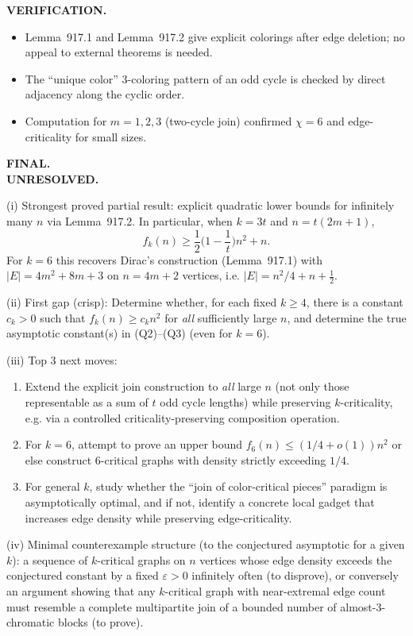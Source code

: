 \medskip
\noindent\textbf{VERIFICATION.}\\
\begin{itemize}
\item Lemma~917.1 and Lemma~917.2 give explicit colorings after edge deletion; no appeal to external theorems is needed.
\item The ``unique color'' 3-coloring pattern of an odd cycle is checked by direct adjacency along the cyclic order.
\item Computation for $m=1,2,3$ (two-cycle join) confirmed $\chi=6$ and edge-criticality for small sizes.
\end{itemize}

\medskip
\noindent\textbf{FINAL.}\\
\textbf{UNRESOLVED.}

(i) Strongest proved partial result: explicit quadratic lower bounds for infinitely many $n$ via Lemma~917.2. In particular, when $k=3t$ and $n=t(2m+1)$,
\[
 f_k(n)\ge \frac12\Big(1-\frac{1}{t}\Big)n^2+n.
\]
For $k=6$ this recovers Dirac's construction (Lemma~917.1) with $|E|=4m^2+8m+3$ on $n=4m+2$ vertices, i.e. $|E|=n^2/4+n+\tfrac12$.

(ii) First gap (crisp): Determine whether, for each fixed $k\ge 4$, there is a constant $c_k>0$ such that $f_k(n)\ge c_k n^2$ for \emph{all} sufficiently large $n$, and determine the true asymptotic constant(s) in (Q2)--(Q3) (even for $k=6$).

(iii) Top 3 next moves:
\begin{enumerate}
\item Extend the explicit join construction to \emph{all} large $n$ (not only those representable as a sum of $t$ odd cycle lengths) while preserving $k$-criticality, e.g. via a controlled criticality-preserving composition operation.
\item For $k=6$, attempt to prove an upper bound $f_6(n)\le (1/4+o(1))n^2$ or else construct $6$-critical graphs with density strictly exceeding $1/4$.
\item For general $k$, study whether the ``join of color-critical pieces'' paradigm is asymptotically optimal, and if not, identify a concrete local gadget that increases edge density while preserving edge-criticality.
\end{enumerate}

(iv) Minimal counterexample structure (to the conjectured asymptotic for a given $k$): a sequence of $k$-critical graphs on $n$ vertices whose edge density exceeds the conjectured constant by a fixed $\varepsilon>0$ infinitely often (to disprove), or conversely an argument showing that any $k$-critical graph with near-extremal edge count must resemble a complete multipartite join of a bounded number of almost-3-chromatic blocks (to prove).


